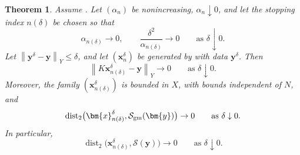 \documentclass{article}
\newtheorem{theorem}{Theorem}[section]
\theoremstyle{remark}
\newcommand{\norm}[1]{\left\lVert #1 \right\rVert}
\newcommand{\Ssol}{\mathcal{S}}
\newcommand{\bx}{{\bm{x}}}
\newcommand{\by}{{\bm{y}}}
\begin{document}
\begin{theorem}
\label{thm:standard-vanishing-noise}
Assume .
Let $(\alpha_n)$ be nonincreasing, $\alpha_n\downarrow0$, and let the stopping
index $n(\delta)$ be chosen so that
\begin{equation}\label{eq:apriori-rule}
\alpha_{n(\delta)}\to0,
\qquad
\frac{\delta^2}{\alpha_{n(\delta)}}\to0
\qquad\text{as }\delta\downarrow0.
\end{equation}
Let $\norm{\by^\delta-\by}_Y\le\delta$, and let $(\bx_n^\delta)$ be generated by
 with data $\by^\delta$. Then
\begin{equation}\label{eq:apriori-residual-convergence}
\norm{K\bx_{n(\delta)}^\delta-\by}_Y\to0
\qquad\text{as }\delta\downarrow0.
\end{equation}
Moreover, the family $(\bx_{n(\delta)}^\delta)$ is bounded in $X$, with
bounds independent of $N$, and
\begin{equation}\label{eq:set-convergence-Sgm}
\operatorname{dist}_2
\bigl(\bx_{n(\delta)}^\delta,\mathcal S_{\rm gm}(\by)\bigr)
\to0
\qquad\text{as }\delta\downarrow0.
\end{equation}
In particular,
\begin{equation}\label{eq:set-convergence-S}
\operatorname{dist}_2
\bigl(\bx_{n(\delta)}^\delta,\Ssol(\by)\bigr)
\to0
\qquad\text{as }\delta\downarrow0.
\end{equation}
\end{theorem}
\end{document}
